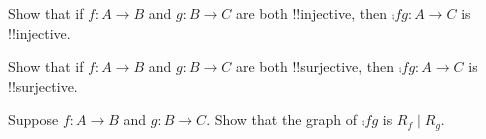 \documentclass[../../../include/open-logic-section]{subfiles}
\begin{document}
\begin{prob}
Show that if $f \colon A \to B$ and $g \colon B \to C$ are both
!!{injective}, then $\comp{f}{g}\colon A \to C$ is !!{injective}.
\end{prob}

\begin{prob}
Show that if $f \colon A \to B$ and $g \colon B \to C$ are both
!!{surjective}, then $\comp{f}{g}\colon A \to C$ is !!{surjective}.
\end{prob}

\begin{prob}
Suppose $f \colon A \to B$ and $g \colon B \to C$. Show that the graph
of $\comp{f}{g}$ is $R_f \mid R_g$.
\end{prob}
\end{document}
